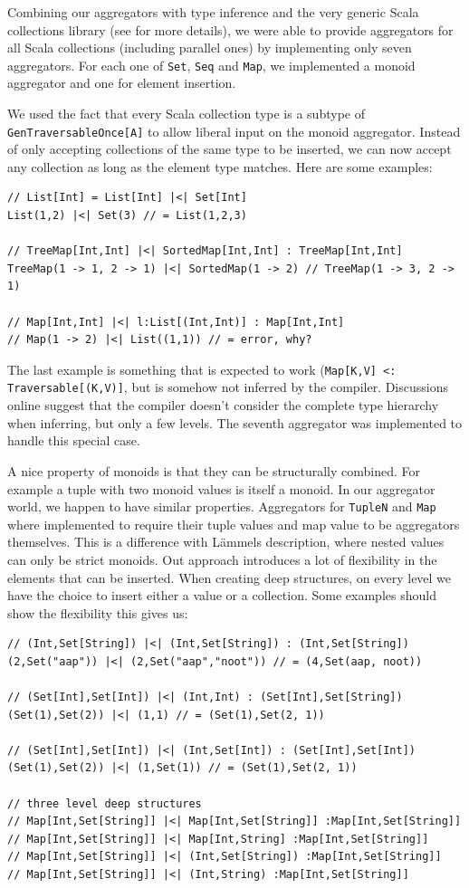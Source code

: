\documentclass[10pt,a4paper]{article}
\begin{document}
Combining our aggregators with type inference and the very generic Scala collections library (see \citep{odersky2009fighting} for more details), we were able to provide aggregators for all Scala collections (including parallel ones) by implementing only seven aggregators. For each one of \lstinline|Set|, \lstinline|Seq| and \lstinline|Map|, we implemented a monoid aggregator and one for element insertion.

We used the fact that every Scala collection type is a subtype of \lstinline|GenTraversableOnce[A]| to allow liberal input on the monoid aggregator. Instead of only accepting collections of the same type to be inserted, we can now accept any collection as long as the element type matches. Here are some examples:
\begin{lstlisting}
// List[Int] = List[Int] |<| Set[Int]
List(1,2) |<| Set(3) // = List(1,2,3)

// TreeMap[Int,Int] |<| SortedMap[Int,Int] : TreeMap[Int,Int]
TreeMap(1 -> 1, 2 -> 1) |<| SortedMap(1 -> 2) // TreeMap(1 -> 3, 2 -> 1)

// Map[Int,Int] |<| l:List[(Int,Int)] : Map[Int,Int]
// Map(1 -> 2) |<| List((1,1)) // = error, why?
\end{lstlisting}
The last example is something that is expected to work (\lstinline|Map[K,V] <: Traversable[(K,V)]|, but is somehow not inferred by the compiler. Discussions online suggest that the compiler doesn't consider the complete type hierarchy when inferring, but only a few levels. The seventh aggregator was implemented to handle this special case.

A nice property of monoids is that they can be structurally combined. For example a tuple with two monoid values is itself a monoid. In our aggregator world, we happen to have similar properties. Aggregators for \lstinline|TupleN| and \lstinline|Map| where implemented to require their tuple values and map value to be aggregators themselves. This is a difference with L\"ammels description, where nested values can only be strict monoids. Out approach introduces a lot of flexibility in the elements that can be inserted. When creating deep structures, on every level we have the choice to insert either a value or a collection. Some examples should show the flexibility this gives us:
\begin{lstlisting}
// (Int,Set[String]) |<| (Int,Set[String]) : (Int,Set[String])
(2,Set("aap")) |<| (2,Set("aap","noot")) // = (4,Set(aap, noot))

// (Set[Int],Set[Int]) |<| (Int,Int) : (Set[Int],Set[String])
(Set(1),Set(2)) |<| (1,1) // = (Set(1),Set(2, 1))

// (Set[Int],Set[Int]) |<| (Int,Set[Int]) : (Set[Int],Set[Int])
(Set(1),Set(2)) |<| (1,Set(1)) // = (Set(1),Set(2, 1))

// three level deep structures
// Map[Int,Set[String]] |<| Map[Int,Set[String]] :Map[Int,Set[String]]
// Map[Int,Set[String]] |<| Map[Int,String] :Map[Int,Set[String]]
// Map[Int,Set[String]] |<| (Int,Set[String]) :Map[Int,Set[String]]
// Map[Int,Set[String]] |<| (Int,String) :Map[Int,Set[String]]
\end{lstlisting}
\end{document}
